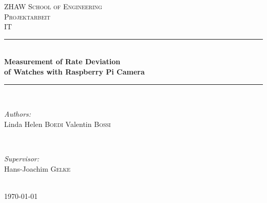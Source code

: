 \documentclass[12pt, a4paper]{report}
\begin{document}
    
    \begin{titlepage}
    
    \newcommand{\HRule}{\rule{\linewidth}{0.5mm}} %
    
    \center %
    
    \textsc{\LARGE ZHAW School of Engineering}\\[1.5cm] %
    \textsc{\Large Projektarbeit}\\[0.5cm] %
    \textsc{\large IT}\\[0.5cm] %
    
    \HRule \\[0.4cm]
    { \huge \bfseries Measurement of Rate Deviation}\\[0.4cm] %
      { \huge \bfseries  of Watches with Raspberry Pi Camera}\\[0.4cm] %

    \HRule \\[1.5cm]
    
    
    \begin{minipage}{0.4\textwidth}
    \begin{flushleft} \large
    \emph{Authors:}\\
    Linda Helen \textsc{Boedi}  Valentin \textsc{Bossi} %
    \end{flushleft}
    \end{minipage}
    ~
    \begin{minipage}{0.4\textwidth}
    \begin{flushright} \large
    \emph{Supervisor:} \\
    Hans-Joachim  \textsc{Gelke} %
    \end{flushright}
    \end{minipage}\\[2cm]
    
    
    {\large \today}\\[2cm] 
    

\end{titlepage}
\end{document}
